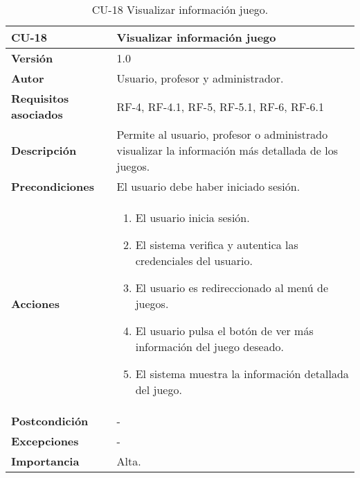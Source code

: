 \begin{table}[h!]
	\centering
	\begin{tabularx}{\linewidth}{ p{} p{} }
		\toprule
		\textbf{CU-18}    & \textbf{Visualizar información juego}\\
		\toprule
		\textbf{Versión}              & 1.0    \\
		\textbf{Autor}                & Usuario, profesor y administrador. \\
		\textbf{Requisitos asociados} & RF-4, RF-4.1, RF-5, RF-5.1, RF-6, RF-6.1 \\
		\textbf{Descripción}          & Permite al usuario, profesor o administrado visualizar la información más detallada de los juegos.\\
		\textbf{Precondiciones}         & El usuario debe haber iniciado sesión. \\
		\textbf{Acciones}             &
		\begin{enumerate}
			\def\labelenumi{\arabic{enumi}.}
			\tightlist
			\item El usuario inicia sesión.
            \item El sistema verifica y autentica las credenciales del usuario.
            \item El usuario es redireccionado al menú de juegos.
            \item El usuario pulsa el botón de ver más información del juego deseado.
            \item El sistema muestra la información detallada del juego.
		\end{enumerate}\\
         \textbf{Postcondición}             & - \\
		\textbf{Excepciones}             & - \\
		\textbf{Importancia}          & Alta. \\
		\bottomrule
	\end{tabularx}
	\caption{CU-18 Visualizar información juego.}
\end{table}

